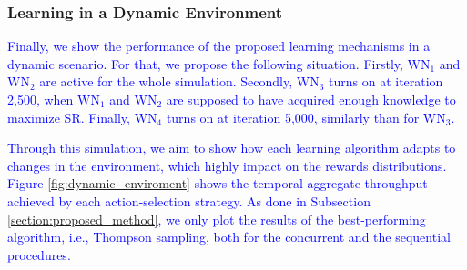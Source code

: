 \documentclass[preprint,12pt]{elsarticle}
\begin{document}
	\subsubsection{Learning in a Dynamic Environment}
	\label{section:dynamic_environment}
	
	\textcolor{blue}{Finally, we show the performance of the proposed learning mechanisms in a dynamic scenario. For that, we propose the following situation. Firstly, $\text{WN}_1$ and $\text{WN}_2$ are active for the whole simulation. Secondly, $\text{WN}_3$ turns on at iteration 2,500, when $\text{WN}_1$ and $\text{WN}_2$ are supposed to have acquired enough knowledge to maximize SR. Finally, $\text{WN}_4$ turns on at iteration 5,000, similarly than for $\text{WN}_3$.}
	
	\textcolor{blue}{Through this simulation, we aim to show how each learning algorithm adapts to changes in the environment, which highly impact on the rewards distributions. Figure \ref{fig:dynamic_enviroment} shows the temporal aggregate throughput achieved by each action-selection strategy. As done in Subsection \ref{section:proposed_method}, we only plot the results of the best-performing algorithm, i.e., Thompson sampling, both for the concurrent and the sequential procedures.}
	
\end{document}
